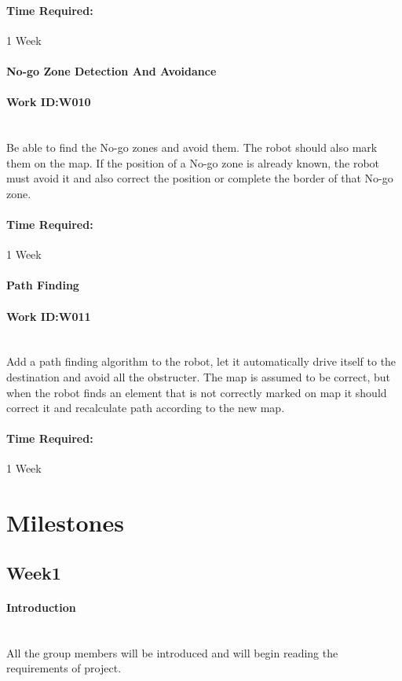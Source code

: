 \documentclass[11pt, a4paper]{report}
\begin{document}
\paragraph{Time Required:}1 Week


\paragraph{No-go Zone Detection And Avoidance}
\paragraph{Work ID:W010}\\
Be able to find the No-go zones and avoid them. The robot should also mark them on the map. If the position of a No-go zone is already known, the robot must avoid it and also correct the position or complete the border of that No-go zone.
\paragraph{Time Required:}1 Week




\paragraph{Path Finding}
\paragraph{Work ID:W011}\\
Add a path finding algorithm to the robot, let it automatically drive itself to the destination and avoid all the obstructer. The map is assumed to be correct, but when the robot finds an element that is not correctly marked on map it should correct it and recalculate path according to the new map.
\paragraph{Time Required:}1 Week




\section{Milestones}
\subsection{Week1}
\paragraph{Introduction}\\
All the group members will be introduced and will begin reading the requirements of project.
\end{document}
